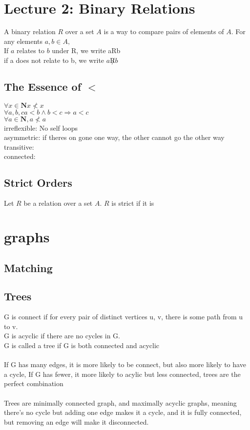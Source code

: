 \documentclass{article}
\begin{document}
\section{Lecture 2: Binary Relations}
A binary relation $R$ over a set $A$ is a way to compare pairs of elements of $A$. For any elements $a, b \in A,$\\
If $a$ relates to $b$ under R, we write aRb \\
if a does not relate to b, we write $a\not Rb$
\subsection{The Essence of $<$}
$\forall x \in \mathbf{N} x \not < x$\\
$\forall a, b, c    a<b \wedge b < c \Rightarrow a < c$ \\
$\forall a \in \mathbf{N}, a \not < a$\\
irreflexible: No self loops\\
asymmetric: if theres on gone one way, the other cannot go the other way\\
transitive: \\
connected: \\
\subsection{Strict Orders}
Let $R$ be a relation over a set $A$. $R$ is strict if it is \\
\section{graphs}
\subsection{Matching}

\subsection{Trees}
G is connect if for every pair of distinct vertices u, v, there is some path from u to v. \\
G is acyclic if there are no cycles in G.\\
G is called a tree if G is both connected and acyclic\\ \\
If G has many edges, it is more likely to be connect, but also more likely to have a cycle, If G has fewer, it more likely to acylic but less connected, trees are the perfect combination\\ \\
Trees are minimally connected graph, and maximally acyclic graphs, meaning there's no cycle but adding one edge makes it a cycle, and it is fully connected, but removing an edge will make it disconnected.\\ \\
\end{document}
